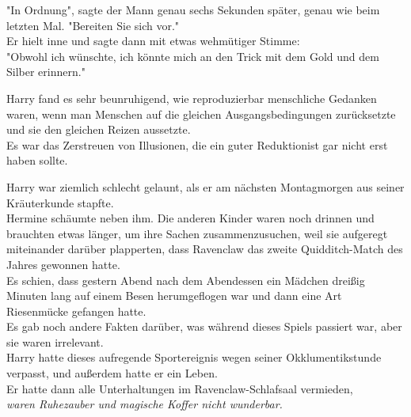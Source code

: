 {"In Ordnung", sagte der Mann genau sechs Sekunden später, genau wie beim letzten Mal. "Bereiten Sie sich vor."\\ Er hielt inne und sagte dann mit etwas wehmütiger Stimme:\\ "Obwohl ich wünschte, ich könnte mich an den Trick mit dem Gold und dem Silber erinnern."

Harry fand es sehr beunruhigend, wie reproduzierbar menschliche Gedanken waren, wenn man Menschen auf die gleichen Ausgangsbedingungen zurücksetzte und sie den gleichen Reizen aussetzte.\\ Es war das Zerstreuen von Illusionen, die ein guter Reduktionist gar nicht erst haben sollte.

Harry war ziemlich schlecht gelaunt, als er am nächsten Montagmorgen aus seiner Kräuterkunde stapfte.\\ Hermine schäumte neben ihm. Die anderen Kinder waren noch drinnen und brauchten etwas länger, um ihre Sachen zusammenzusuchen, weil sie aufgeregt miteinander darüber plapperten, dass Ravenclaw das zweite Quidditch-Match des Jahres gewonnen hatte.\\ Es schien, dass gestern Abend nach dem Abendessen ein Mädchen dreißig Minuten lang auf einem Besen herumgeflogen war und dann eine Art Riesenmücke gefangen hatte.\\ Es gab noch andere Fakten darüber, was während dieses Spiels passiert war, aber sie waren irrelevant.\\ Harry hatte dieses aufregende Sportereignis wegen seiner Okklumentikstunde verpasst, und außerdem hatte er ein Leben.\\ Er hatte dann alle Unterhaltungen im Ravenclaw-Schlafsaal vermieden,\\ \emph{waren Ruhezauber und magische Koffer nicht wunderbar.}

}
